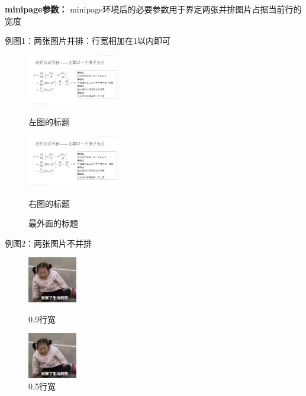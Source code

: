\documentclass[UTF8]{ctexart}
\begin{document}
    \textbf{minipage参数：} minipage环境后的必要参数用于界定两张并排图片占据当前行的宽度
    
    例图1：两张图片并排：行宽相加在1以内即可
     \begin{figure}[H]
    	\begin{minipage}{0.49\linewidth}
    		\centering
    		\includegraphics[width=4.0cm]{1.png}
    		\caption{左图的标题}
    	\end{minipage}
    	\begin{minipage}{0.49\linewidth}
    		\centering
    		\includegraphics[width=4.0cm]{1.png}
    		\caption{右图的标题}
    	\end{minipage}
        \caption{最外面的标题}
    \end{figure}
    
    例图2：两张图片不并排
    \begin{figure}[!htbp]
    	\begin{minipage}{0.9\linewidth} %
    		\begin{flushright} %
    			\includegraphics[height=2cm]{2.jpg}
    			\caption{0.9行宽}
    		\end{flushright}
    	\end{minipage}
    	\begin{minipage}{0.5\linewidth} %
    		\begin{flushright} %
    			\includegraphics[height=2cm]{2.jpg}
    			\caption{0.5行宽}
    		\end{flushright}
    	\end{minipage}
    \end{figure}
\end{document}
